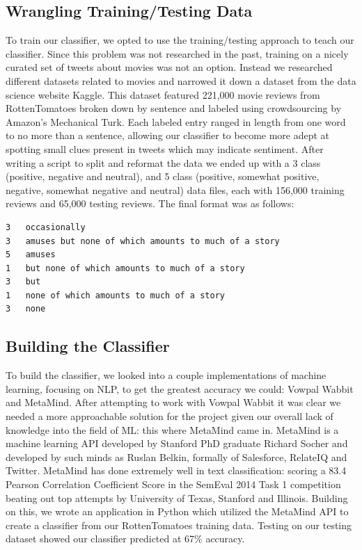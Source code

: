 \documentclass[12pt]{article}
\begin{document}
\subsection{Wrangling Training/Testing Data}\label{S:4}
To train our classifier, we opted to use the training/testing approach to teach our classifier. Since this problem was not researched in the past, training on a nicely curated set of tweets about movies was not an option. Instead we researched different datasets related to movies and narrowed it down a dataset from the data science website Kaggle. This dataset featured 221,000 movie reviews from RottenTomatoes broken down by sentence and labeled using crowdsourcing by Amazon's Mechanical Turk. Each labeled entry ranged in length from one word to no more than a sentence, allowing our classifier to become more adept at spotting small clues present in tweets which may indicate sentiment. After writing a script to split and reformat the data we ended up with a 3 class (positive, negative and neutral), and 5 class (positive, somewhat positive, negative, somewhat negative and neutral) data files, each with 156,000 training reviews and 65,000 testing reviews. The final format was as follows:
\begin{verbatim}
3   occasionally
3   amuses but none of which amounts to much of a story
5   amuses
1   but none of which amounts to much of a story
3   but
1   none of which amounts to much of a story
3   none
\end{verbatim}
\subsection{Building the Classifier}
To build the classifier, we looked into a couple implementations of machine learning, focusing on NLP, to get the greatest accuracy we could: Vowpal Wabbit and MetaMind. After attempting to work with Vowpal Wabbit it was clear we needed a more approachable solution for the project given our overall lack of knowledge into the field of ML: this where MetaMind came in. MetaMind is a machine learning API developed by Stanford PhD graduate Richard Socher and developed by such minds as Ruslan Belkin, formally of Salesforce, RelateIQ and Twitter. MetaMind has done extremely well in text classification: scoring a 83.4 Pearson Correlation Coefficient Score in the SemEval 2014 Task 1 competition \cite{SemEval:2014} beating out top attempts by University of Texas, Stanford and Illinois.
Building on this, we wrote an application in Python which utilized the MetaMind API to create a classifier from our RottenTomatoes training data. Testing on our testing dataset showed our classifier predicted at 67\% accuracy. 
\end{document}
